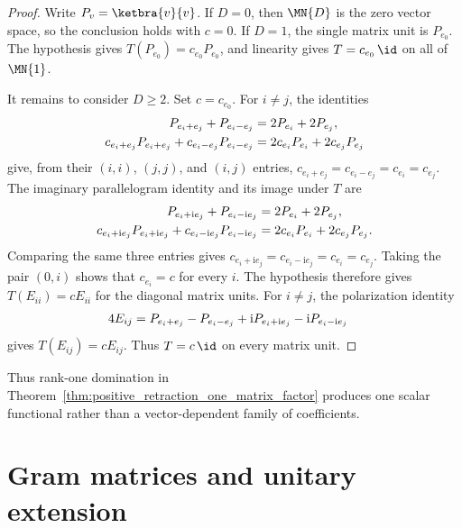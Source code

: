 \begin{proof}
    \leanok
    Write $P_v=\ketbra{v}{v}$. If $D=0$, then $\MN{D}$ is the zero vector
    space, so the conclusion holds with $c=0$. If $D=1$, the single matrix unit
    is $P_{e_0}$. The hypothesis gives $T(P_{e_0})=c_{e_0}P_{e_0}$, and
    linearity gives $T=c_{e_0}\,\id$ on all of $\MN{1}$.

    It remains to consider $D\geq2$. Set $c=c_{e_0}$. For $i\ne j$, the identities
    \begin{align}
        P_{e_i+e_j}+P_{e_i-e_j}
         & =2P_{e_i}+2P_{e_j},
        \notag                              \\
        c_{e_i+e_j}P_{e_i+e_j}+c_{e_i-e_j}P_{e_i-e_j}
         & =2c_{e_i}P_{e_i}+2c_{e_j}P_{e_j}
        \notag
    \end{align}
    give, from their $(i,i)$, $(j,j)$, and $(i,j)$ entries,
    $c_{e_i+e_j}=c_{e_i-e_j}=c_{e_i}=c_{e_j}$.
    The imaginary parallelogram identity and its image under $T$ are
    \begin{align}
        P_{e_i+\mathrm{i}e_j}+P_{e_i-\mathrm{i}e_j}
         & =2P_{e_i}+2P_{e_j},
        \notag                               \\
        c_{e_i+\mathrm{i}e_j}P_{e_i+\mathrm{i}e_j}
        +c_{e_i-\mathrm{i}e_j}P_{e_i-\mathrm{i}e_j}
         & =2c_{e_i}P_{e_i}+2c_{e_j}P_{e_j}.
        \notag
    \end{align}
    Comparing the same three entries gives
    $c_{e_i+\mathrm{i}e_j}=c_{e_i-\mathrm{i}e_j}=c_{e_i}=c_{e_j}$.
    Taking the pair $(0,i)$ shows that $c_{e_i}=c$ for every $i$.
    The hypothesis therefore gives $T(E_{ii})=cE_{ii}$ for the diagonal matrix
    units. For $i\ne j$, the polarization identity
    \begin{align}
        4E_{ij}
         & =P_{e_i+e_j}-P_{e_i-e_j}
        +\mathrm{i}P_{e_i+\mathrm{i}e_j}
        -\mathrm{i}P_{e_i-\mathrm{i}e_j}
        \notag
    \end{align}
    gives $T(E_{ij})=cE_{ij}$. Thus $T=c\,\id$ on every matrix unit.
\end{proof}

Thus rank-one domination in
Theorem~\ref{thm:positive_retraction_one_matrix_factor} produces one scalar
functional rather than a vector-dependent family of coefficients.

\section{Gram matrices and unitary extension}

